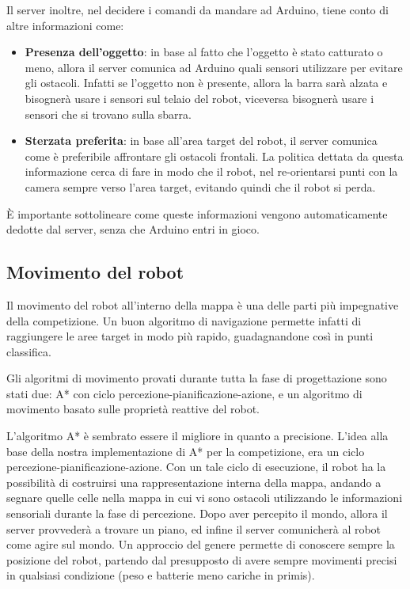 \documentclass[a4paper,12pt,italian]{article}
\begin{document}
Il server inoltre, nel decidere i comandi da mandare ad Arduino, tiene conto di altre informazioni come:
\begin{itemize}
	\item \textbf{Presenza dell'oggetto}: in base al fatto che l'oggetto è stato catturato o meno, allora il server comunica ad Arduino quali sensori utilizzare per evitare gli ostacoli. Infatti se l'oggetto non è presente, allora la barra sarà alzata e bisognerà usare i sensori sul telaio del robot, viceversa bisognerà usare i sensori che si trovano sulla sbarra.
	\item \textbf{Sterzata preferita}: in base all'area target del robot, il server comunica come è preferibile affrontare gli ostacoli frontali. La politica  dettata da questa informazione cerca di fare in modo che il robot, nel re-orientarsi punti con la camera sempre verso l'area target, evitando quindi che il robot si perda. 
\end{itemize}

È importante sottolineare come queste informazioni vengono automaticamente dedotte dal server, senza che Arduino entri in gioco.

\subsection{Movimento del robot}
Il movimento del robot all'interno della mappa è una delle parti più impegnative della competizione. Un buon algoritmo di navigazione permette infatti di raggiungere le aree target in modo più rapido, guadagnandone così in punti classifica.

Gli algoritmi di movimento provati durante tutta la fase di progettazione sono stati due: A* con ciclo percezione-pianificazione-azione, e un algoritmo di movimento basato sulle proprietà reattive del robot.

L'algoritmo A* è sembrato essere il migliore in quanto a precisione. L'idea alla base della nostra implementazione di A* per la competizione, era un ciclo percezione-pianificazione-azione. Con un tale ciclo di esecuzione, il robot ha la possibilità di costruirsi una rappresentazione interna della mappa, andando a segnare quelle celle nella mappa in cui vi sono ostacoli utilizzando le informazioni sensoriali durante la fase di percezione. Dopo aver percepito il mondo, allora il server provvederà a trovare un piano, ed infine il server comunicherà al robot come agire sul mondo. Un approccio del genere permette di conoscere sempre la posizione del robot, partendo dal presupposto di avere sempre movimenti precisi in qualsiasi condizione (peso e batterie meno cariche in primis).
\end{document}
